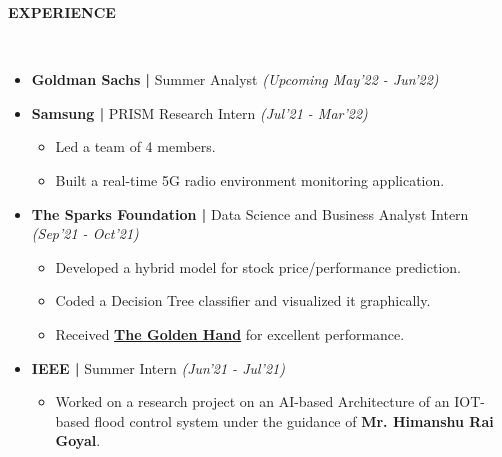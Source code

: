 \documentclass[a4paper,10pt]{article}
\newcommand{\lsep}{-0.5cm}
\newcommand{\resheading}[1]{{\small \colorbox{mygrey}{\begin{minipage}{0.98\textwidth}{\textbf{#1 \vphantom{p\^{E}}}}\end{minipage}}}}
\begin{document}
\resheading{\textbf{EXPERIENCE} }\\[\lsep]
\begin{itemize}[itemsep=0.01mm, parsep=0.1pt]
\item \textbf{Goldman Sachs |} Summer Analyst \textit{(Upcoming May'22 - Jun'22)}
\item \textbf{Samsung |} PRISM Research Intern \textit{(Jul'21 - Mar'22)}
\begin{itemize}[itemsep=0.01mm]
\item Led a team of 4 members.
\item Built a real-time 5G radio environment monitoring application.
\end{itemize}
\item \textbf{The Sparks Foundation |} Data Science and Business Analyst Intern \textit{(Sep'21 - Oct'21)}
\begin{itemize}[itemsep=0.01mm]
\item Developed a hybrid model for stock price/performance prediction.
\item Coded a Decision Tree classifier and visualized it graphically.
\item Received \href{https://truecertificates.com/verified/V5FZSXAR8E}{\textbf{The Golden Hand}} for excellent performance.
\end{itemize}
\item \textbf{IEEE |}  Summer Intern \textit{(Jun'21 - Jul'21)}
\begin{itemize}[itemsep=0.01mm]
\item Worked on a research project on an AI-based Architecture of an IOT-based flood control system under the guidance of \textbf{Mr. Himanshu Rai Goyal}.
\end{itemize}
\end{itemize}
\end{document}
